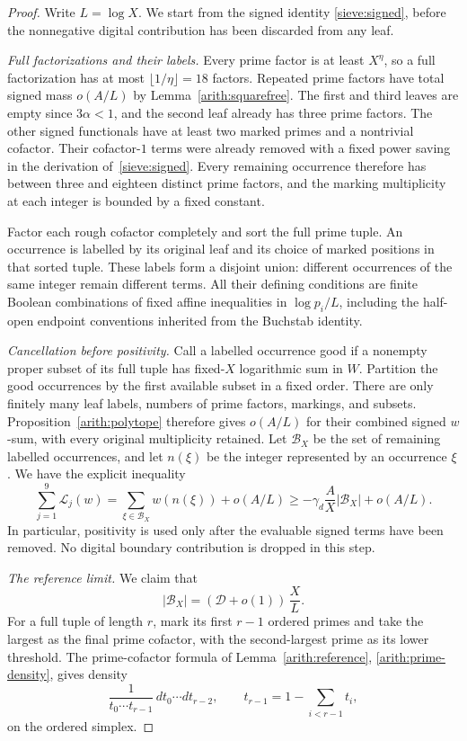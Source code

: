 \documentclass[11pt,a4paper]{article}
\theoremstyle{paperplain}
\numberwithin{equation}{section}
\begin{document}
\begin{proof}
Write $L=\log X$. We start from the signed identity
\eqref{sieve:signed}, before the nonnegative digital contribution has
been discarded from any leaf.

\emph{Full factorizations and their labels.}
Every prime factor is at least $X^\eta$, so a full factorization has at
most $\lfloor1/\eta\rfloor=18$ factors. Repeated prime factors have total
signed mass $o(A/L)$ by Lemma~\ref{arith:squarefree}.
The first and third leaves are empty since $3\alpha<1$, and the second
leaf already has three prime factors.
The other signed functionals have at least two marked primes and a
nontrivial cofactor. Their cofactor-$1$ terms were already removed with a
fixed power saving in the derivation of~\eqref{sieve:signed}.
Every remaining occurrence therefore has between three and eighteen
distinct prime factors, and the marking multiplicity at each integer is
bounded by a fixed constant.

Factor each rough cofactor completely and sort the full prime tuple.
An occurrence is labelled by its original leaf and its choice of marked
positions in that sorted tuple. These labels form a disjoint union:
different occurrences of the same integer remain different terms.
All their defining conditions are finite Boolean combinations of fixed
affine inequalities in $\log p_i/L$, including the half-open endpoint
conventions inherited from the Buchstab identity.

\emph{Cancellation before positivity.}
Call a labelled occurrence good if a nonempty proper subset of its full
tuple has fixed-$X$ logarithmic sum in $W$.
Partition the good occurrences by the first available subset in a fixed
order. There are only finitely many leaf labels, numbers of prime factors,
markings, and subsets. Proposition~\ref{arith:polytope} therefore gives
$o(A/L)$ for their combined signed $w$-sum, with every original multiplicity
retained.
Let $\mathscr B_X$ be the set of remaining labelled occurrences, and let
$n(\xi)$ be the integer represented by an occurrence $\xi$.
We have the explicit inequality
\begin{equation}\label{nine:signed-deletion}
 \sum_{j=1}^9\mathcal L_j(w)
 =\sum_{\xi\in\mathscr B_X}w(n(\xi))+o(A/L)
 \ge-\gamma_d\frac AX|\mathscr B_X|+o(A/L).
\end{equation}
In particular, positivity is used only after the evaluable signed terms
have been removed. No digital boundary contribution is dropped in this step.

\emph{The reference limit.}
We claim that
\begin{equation}\label{nine:bad-reference}
 |\mathscr B_X|=(\mathcal D+o(1))\,\frac X L.
\end{equation}
For a full tuple of length $r$, mark its first $r-1$ ordered primes and
take the largest as the final prime cofactor, with the second-largest
prime as its lower threshold.
The prime-cofactor formula of Lemma~\ref{arith:reference},
\eqref{arith:prime-density}, gives density
\[
 \frac1{t_0\cdots t_{r-1}}\,dt_0\cdots dt_{r-2},
 \qquad t_{r-1}=1-\sum_{i<r-1}t_i,
\]
on the ordered simplex.


\end{proof}
\end{document}
